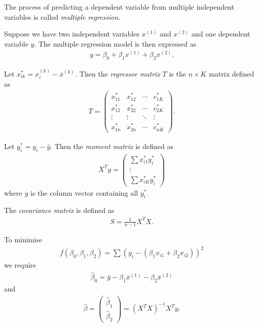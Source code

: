 \documentclass{article}
\begin{document}
\begin{definition}
	The process of predicting a dependent variable from multiple independent variables is called \emph{multiple regression}.
\end{definition}
\begin{definition}
	Suppose we have two independent variables $x^{(1)}$ and $x^{(2)}$ and one dependent variable $y$.
	The multiple regression model is then expressed as
	\begin{align*}
		y = \beta_0 + \beta_1 x^{(1)} + \beta_2 x^{(2)}.
	\end{align*}
\end{definition}
\begin{definition}
	Let $x^*_{ik}=x^{(k)}_i - \bar x^{(k)}$. Then the \emph{regressor matrix} $T$ is
	the $n\times K$ matrix defined as
	\begin{align*}
		T = \begin{pmatrix}
			x^*_{11} & x^*_{12} & \cdots & c^*_{1K}\\
			x^*_{12} & x^*_{22} & \cdots & c^*_{2K}\\
			\vdots & \vdots & \ddots & \vdots\\
			x^*_{1n} & x^*_{2n} &\cdots & c^*_{nK}
		\end{pmatrix}.
	\end{align*}
\end{definition}
\begin{definition}
	Let $y^*_i=y_i-\bar y$. Then the \emph{moment matrix} is defined as
	\begin{align*}
		X^T y = \begin{pmatrix}
			\sum x^*_{i1} y^*_i\\
			\vdots\\
			\sum x^*_{iK} y^*_i
		\end{pmatrix}
	\end{align*}
	where $y$ is the column vector containing all $y^*_i$.	
\end{definition}
\begin{definition}
	The \emph{covariance matrix} is defined as
	\begin{align*}
		S =\frac{1}{n-1}X^T X.
	\end{align*}
\end{definition}
\begin{theorem}
	To minimise
	\begin{align*}
		f(\beta_0, \beta_1, \beta_2) = \sum (y_i - (\beta_1 x_{i1}+\beta_2 x_{i2}))^2
	\end{align*}
	we require
	\begin{align*}
		\hat\beta_0 = \bar y - \beta_1\bar x^{(1)} - \beta_2\bar x^{(2)}
	\end{align*}
	and
	\begin{align*}
		\hat\beta = \begin{pmatrix}
			\hat\beta_1\\
			\hat\beta_2
		\end{pmatrix}
		= (X^T X)^{-1}X^T y.
	\end{align*}
\end{theorem}
\end{document}
